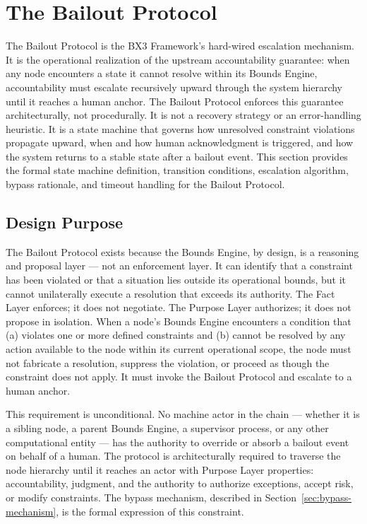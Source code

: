 \section{The Bailout Protocol}
\label{sec:bailout-protocol}

The Bailout Protocol is the BX3 Framework's hard-wired escalation mechanism. It is the operational realization of the upstream accountability guarantee: when any node encounters a state it cannot resolve within its Bounds Engine, accountability must escalate recursively upward through the system hierarchy until it reaches a human anchor. The Bailout Protocol enforces this guarantee architecturally, not procedurally. It is not a recovery strategy or an error-handling heuristic. It is a state machine that governs how unresolved constraint violations propagate upward, when and how human acknowledgment is triggered, and how the system returns to a stable state after a bailout event. This section provides the formal state machine definition, transition conditions, escalation algorithm, bypass rationale, and timeout handling for the Bailout Protocol.

\subsection{Design Purpose}

The Bailout Protocol exists because the Bounds Engine, by design, is a reasoning and proposal layer — not an enforcement layer. It can identify that a constraint has been violated or that a situation lies outside its operational bounds, but it cannot unilaterally execute a resolution that exceeds its authority. The Fact Layer enforces; it does not negotiate. The Purpose Layer authorizes; it does not propose in isolation. When a node's Bounds Engine encounters a condition that (a) violates one or more defined constraints and (b) cannot be resolved by any action available to the node within its current operational scope, the node must not fabricate a resolution, suppress the violation, or proceed as though the constraint does not apply. It must invoke the Bailout Protocol and escalate to a human anchor.

This requirement is unconditional. No machine actor in the chain — whether it is a sibling node, a parent Bounds Engine, a supervisor process, or any other computational entity — has the authority to override or absorb a bailout event on behalf of a human. The protocol is architecturally required to traverse the node hierarchy until it reaches an actor with Purpose Layer properties: accountability, judgment, and the authority to authorize exceptions, accept risk, or modify constraints. The bypass mechanism, described in Section~\ref{sec:bypass-mechanism}, is the formal expression of this constraint.

